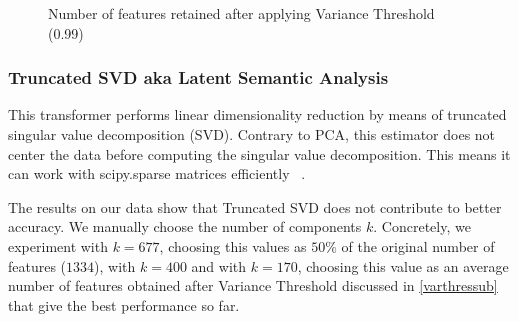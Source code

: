 \begin{figure}
\label{featuresretainedfigure}
\centering
\caption{Number of features retained after applying Variance Threshold (0.99)}
\end{figure}




\subsubsection{Truncated SVD aka Latent Semantic Analysis}

This transformer performs linear dimensionality reduction by means of truncated singular value decomposition (SVD). Contrary to PCA, this estimator does not center the data before computing the singular value decomposition. This means it can work with scipy.sparse matrices efficiently ~\citep{trunsvd}. 

The results on our data show that Truncated SVD does not contribute to better accuracy. We manually choose the number of components $k$. Concretely, we experiment with $k=677$, choosing this values as $50\%$ of the original number of features ($1334$), with $k=400$ and with $k=170$, choosing this value as an average number of features obtained after Variance Threshold discussed in \ref{varthressub} that give the best performance so far.

